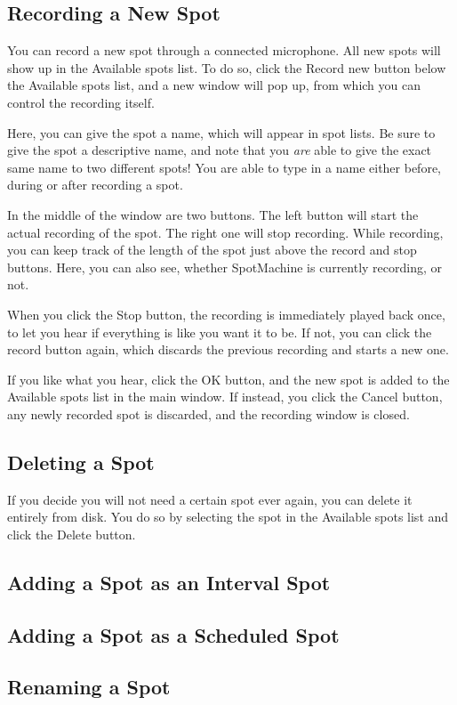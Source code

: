 \documentclass[a4paper,12pt]{article}
\begin{document}
\subsection{Recording a New Spot}
You can record a new spot through a connected microphone. All new spots will show up in the Available spots list. To do so, click the Record new button below the Available spots list, and a new window will pop up, from which you can control the recording itself.

Here, you can give the spot a name, which will appear in spot lists. Be sure to give the spot a descriptive name, and note that you {\em are} able to give the exact same name to two different spots! You are able to type in a name either before, during or after recording a spot.

In the middle of the window are two buttons. The left button will start the actual recording of the spot. The right one will stop recording. While recording, you can keep track of the length of the spot just above the record and stop buttons. Here, you can also see, whether SpotMachine is currently recording, or not.

When you click the Stop button, the recording is immediately played back once, to let you hear if everything is like you want it to be. If not, you can click the record button again, which discards the previous recording and starts a new one.

If you like what you hear, click the OK button, and the new spot is added to the Available spots list in the main window. If instead, you click the Cancel button, any newly recorded spot is discarded, and the recording window is closed.

\subsection{Deleting a Spot}
If you decide you will not need a certain spot ever again, you can delete it entirely from disk. You do so by selecting the spot in the Available spots list and click the Delete button.

\subsection{Adding a Spot as an Interval Spot}

\subsection{Adding a Spot as a Scheduled Spot}

\subsection{Renaming a Spot}
\end{document}
